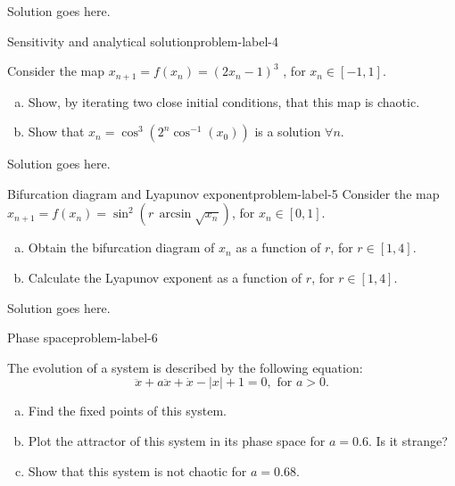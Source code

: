 Solution goes here.

\begin{problem}{Sensitivity and analytical solution}{problem-label-4}

    Consider the map $x_{n+1} = f(x_n) = (2x_n - 1)^3$ , for $x_n \in [-1, 1]$.

    \begin{enumerate}[(a)]
        \item Show, by iterating two close initial conditions, that this map is chaotic.
        \item Show that $x_n = \cos^3 (2^n \cos^{-1} (x_0))$ is a solution $\forall n$.
    \end{enumerate}

\end{problem}

Solution goes here.

\begin{problem}{Bifurcation diagram and Lyapunov exponent}{problem-label-5}
    Consider the map $x_{n+1} = f(x_n) = \sin^2(r\,\arcsin{\sqrt{x_n}})$, for $x_n \in [0, 1]$.

    \begin{enumerate}[(a)]
        \item Obtain the bifurcation diagram of $x_n$ as a function of $r$,
        for $r \in [1, 4]$.
        \item Calculate the Lyapunov exponent as a function of $r$, for $r \in [1, 4]$.
    \end{enumerate}

\end{problem}

Solution goes here.

\begin{problem}{Phase space}{problem-label-6}

    The evolution of a system is described by the following equation:
    \[
        \ddot{x} + a\ddot{x}+\dot{x}-|x|+1=0, \text{ for } a > 0.
    \]

    \begin{enumerate}[(a)]
        \item Find the fixed points of this system.
        \item Plot the attractor of this system in its phase space for $a = 0.6$.
        Is it strange?
        \item Show that this system is not chaotic for $a = 0.68$.
    \end{enumerate}

\end{problem}

